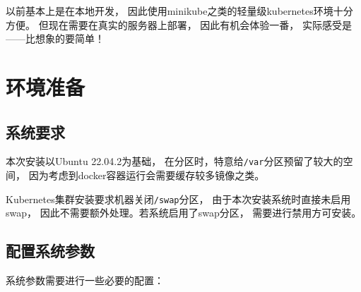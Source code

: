 \documentclass[12pt]{article}
\begin{document}
\makeblogtitle

以前基本上是在本地开发， 因此使用minikube之类的轻量级kubernetes环境十分方便。 但现在需要在真实的服务器上部署， 因此有机会体验一番， 实际感受是------比想象的要简单！

\section{环境准备}\label{ux73afux5883ux51c6ux5907}

\subsection{系统要求}\label{ux7cfbux7edfux8981ux6c42}

本次安装以Ubuntu 22.04.2为基础， 在分区时，特意给\texttt{/var}分区预留了较大的空间， 因为考虑到docker容器运行会需要缓存较多镜像之类。

Kubernetes集群安装要求机器关闭\texttt{/swap}分区， 由于本次安装系统时直接未启用swap， 因此不需要额外处理。若系统启用了swap分区， 需要进行禁用方可安装。

\begin{Shaded}
\begin{Highlighting}[]
\end{Highlighting}
\end{Shaded}

\subsection{配置系统参数}\label{ux914dux7f6eux7cfbux7edfux53c2ux6570}

系统参数需要进行一些必要的配置：

\begin{Shaded}
\begin{Highlighting}[]
  \KeywordTok{|} 


  \KeywordTok{|} 

\end{Highlighting}
\end{Shaded}
\end{document}
